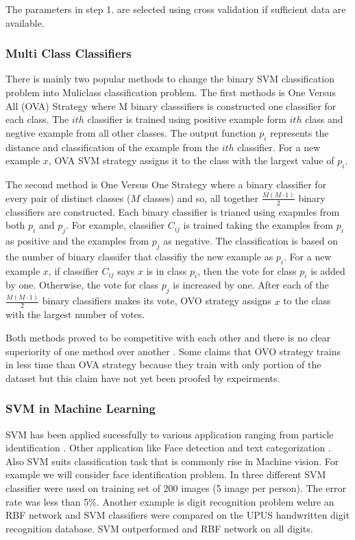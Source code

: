 The parameters in step 1. are selected using cross validation if sufficient data are available. %
\subsubsection {Multi Class Classifiers}
 
 
 There is mainly two popular methods to change the binary SVM classification problem into Muliclass classification problem. The first methods is One Versus All (OVA) Strategy where M binary classsifiers is constructed one classifier for each class.  The $ith$ classifier is trained using positive example form $ith$ class and negtive example from all other classes. The output function $p_i$ represents the distance and classification of the example from the $ith$ classifier. For a new example $x$, OVA SVM strategy assigns it to the class with the largest value of $p_i$. 
 
 The second method is One Versus One Strategy where a binary classifier for every pair of distinct classes ($M$ classes) and so, all together $\frac{M(M \cdot 1)}{2}$ binary classifiers are constructed. Each binary classifier is trianed using exapmles from both $p_i$ and $p_j$. For example, classifier $C_{ij}$ is trained taking the examples from $p_i$ as positive and the examples from $p_j$ as negative. The classification is based on the number of binary classifer that classifiy the new example as $p_i$. For a new example $x$, if classifier $C_{ij}$ says $x$ is in class $p_i$, then the vote for class $p_i$ is added by one. Otherwise, the vote for class $p_j$  is increased by one. After each of the $\frac{M(M \cdot 1)}{2}$  binary classifiers makes its vote,  OVO strategy assigns $x$ to the class with the largest number of votes. 
 
 Both methods proved to be competitive with each other and there is no clear superiority of one method
over another \cite{Duan05whichis} . Some claims that OVO strategy trains in less time than OVA strategy because they train with only portion of the dataset \cite{libsvm} but this claim have not yet been proofed by expeirments.  


\subsubsection{ SVM in Machine Learning }
SVM has been applied sucessfully to various application ranging from particle identification \cite{ParticleSVM7}. Other application like Face detection \cite{faceSVM8,faceSVM7} and text categorization \cite{TextSVM7}. Also SVM suits classification task that is commonly rise in Machine vision. For example we will consider face identification\cite{faceSVM8} problem.   In \cite{faceSVM8} three different SVM classifier were used on training set of 200 images (5 image per person). The error rate was less than 5\%. Another example is digit recognition problem wehre an RBF network and SVM classifiers were compared on the UPUS handwritten digit recognition database\cite{ORLDataset}.  SVM outperformed and RBF network on all digits.  

